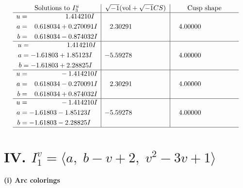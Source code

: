 \documentclass[1p]{elsarticle_modified}
\theoremstyle{definition}
\newcommand{\I}{\sqrt{-1}}
\begin{document}
$$\begin{array}{c|c|c}  
\text{Solutions to }I^u_{3}& \I (\text{vol} + \sqrt{-1}CS) & \text{Cusp shape}\\
 \hline 
\begin{aligned}
u &= \phantom{-0.000000 -}1.414210 I \\
a &= \phantom{-}0.618034 + 0.270091 I \\
b &= \phantom{-}0.618034 - 0.874032 I\end{aligned}
 & \phantom{-}2.30291\phantom{ +0.000000I} & \phantom{-}4.00000\phantom{ +0.000000I} \\ \hline\begin{aligned}
u &= \phantom{-0.000000 -}1.414210 I \\
a &= -1.61803 + 1.85123 I \\
b &= -1.61803 + 2.28825 I\end{aligned}
 & -5.59278\phantom{ +0.000000I} & \phantom{-}4.00000\phantom{ +0.000000I} \\ \hline\begin{aligned}
u &= \phantom{-0.000000 } -1.414210 I \\
a &= \phantom{-}0.618034 - 0.270091 I \\
b &= \phantom{-}0.618034 + 0.874032 I\end{aligned}
 & \phantom{-}2.30291\phantom{ +0.000000I} & \phantom{-}4.00000\phantom{ +0.000000I} \\ \hline\begin{aligned}
u &= \phantom{-0.000000 } -1.414210 I \\
a &= -1.61803 - 1.85123 I \\
b &= -1.61803 - 2.28825 I\end{aligned}
 & -5.59278\phantom{ +0.000000I} & \phantom{-}4.00000\phantom{ +0.000000I}\\
 \hline 
 \end{array}$$\newpage\newpage\renewcommand{\arraystretch}{1}
\centering \section*{IV. $I^v_{1}= \langle a,\;b- v+2,\;v^2-3 v+1 \rangle$}
\flushleft \textbf{(i) Arc colorings}\\
\end{document}
